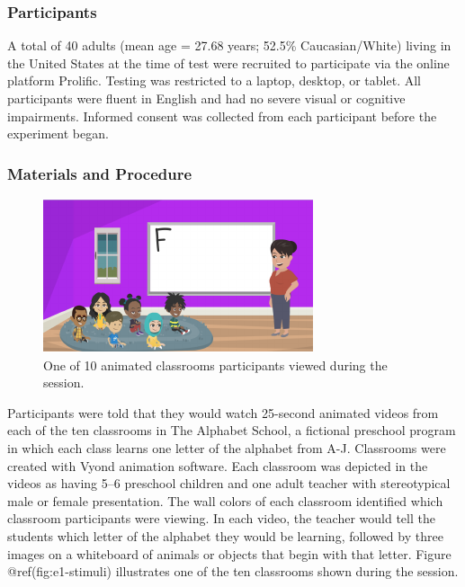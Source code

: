 \documentclass[10pt, letterpaper]{article}
\newenvironment{CodeChunk}{}{}
\begin{document}
\hypertarget{participants}{%
\subsubsection{Participants}\label{participants}}

A total of 40 adults (mean age = 27.68 years; 52.5\% Caucasian/White)
living in the United States at the time of test were recruited to
participate via the online platform Prolific. Testing was restricted to
a laptop, desktop, or tablet. All participants were fluent in English
and had no severe visual or cognitive impairments. Informed consent was
collected from each participant before the experiment began.

\hypertarget{materials-and-procedure}{%
\subsubsection{Materials and Procedure}\label{materials-and-procedure}}

\begin{CodeChunk}
\begin{figure}[t]

{\centering \includegraphics{figs/e1-stimuli-1} 

}

\caption[One of 10 animated classrooms participants viewed during the session]{One of 10 animated classrooms participants viewed during the session.}\label{fig:e1-stimuli}
\end{figure}
\end{CodeChunk}

Participants were told that they would watch 25-second animated videos
from each of the ten classrooms in The Alphabet School, a fictional
preschool program in which each class learns one letter of the alphabet
from A-J. Classrooms were created with Vyond animation software. Each
classroom was depicted in the videos as having 5--6 preschool children
and one adult teacher with stereotypical male or female presentation.
The wall colors of each classroom identified which classroom
participants were viewing. In each video, the teacher would tell the
students which letter of the alphabet they would be learning, followed
by three images on a whiteboard of animals or objects that begin with
that letter. Figure @ref(fig:e1-stimuli) illustrates one of the ten
classrooms shown during the session.
\end{document}
